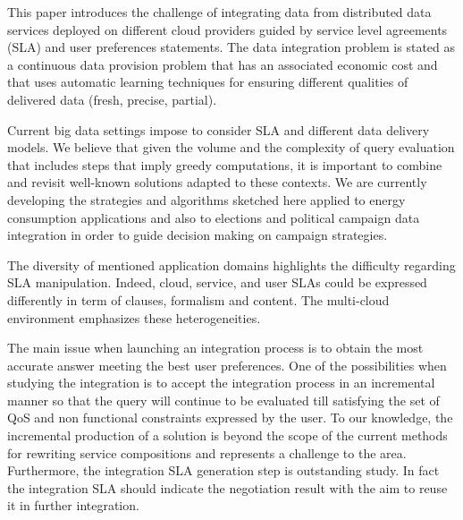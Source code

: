 This paper introduces the challenge of integrating data from distributed data services deployed on different cloud providers guided by service level agreements (SLA) and user preferences statements. The data integration problem is stated as a continuous data provision problem that has an associated economic cost and that uses automatic learning techniques for ensuring different qualities of delivered data (fresh, precise, partial).



Current big data settings impose  to consider SLA and different data delivery models. We believe that given the volume and the complexity of query evaluation that includes steps that imply greedy computations, it is important to combine and revisit well-known solutions  adapted to these contexts. We are currently developing the strategies and algorithms sketched here applied to energy consumption applications and also to elections and political campaign data integration in order to guide decision making on campaign strategies.

The diversity of mentioned application domains highlights the difficulty regarding SLA manipulation. Indeed, cloud, service, and user SLAs could be expressed differently in term of clauses, formalism and content. The multi-cloud environment emphasizes these heterogeneities. 

 
The main issue when launching an integration process is to obtain the most accurate answer meeting the best user preferences. One of the possibilities when studying the integration is to accept the integration process in an incremental  manner so that the query will continue to be evaluated till satisfying the set of QoS and non functional constraints expressed by the user. To our knowledge, the incremental production of a solution is beyond  the scope of the current methods for rewriting service compositions and represents a challenge to the area.
Furthermore, the integration SLA generation step is outstanding study. In fact the integration SLA should indicate the negotiation result with the aim to reuse it in further integration.


% 
%
%
%

